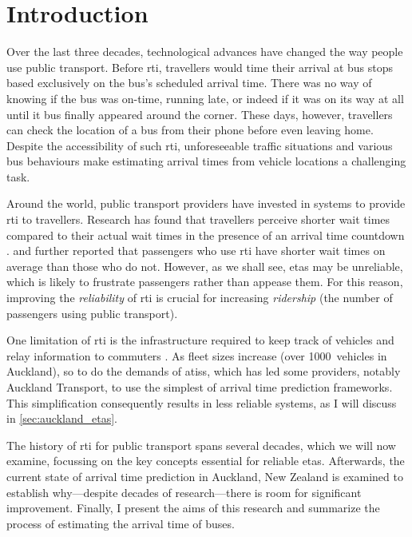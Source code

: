 \glsresetall

\chapter{Introduction}
\label{cha:intro}


Over the last three decades, technological advances have changed the way people use public transport. Before \gls{rti}, travellers would time their arrival at bus stops based exclusively on the bus's scheduled arrival time. There was no way of knowing if the bus was on-time, running late, or indeed if it was on its way at all until it bus finally appeared around the corner. These days, however, travellers can check the location of a bus from their phone before even leaving home. Despite the accessibility of such \gls{rti}, unforeseeable traffic situations and various bus behaviours make estimating arrival times from vehicle locations a challenging task.


Around the world, public transport providers have invested in systems to provide \gls{rti} to travellers. Research has found that travellers perceive shorter wait times compared to their actual wait times in the presence of an arrival time countdown \citep{TCRP_2003}. \citet{Cats_2015} and \citet{Lu_2017} further reported that passengers who use \gls{rti} have shorter wait times on average than those who do not. However, as we shall see, \glspl{eta} may be unreliable, which is likely to frustrate passengers rather than appease them. For this reason, improving the \emph{reliability} of \gls{rti} is crucial for increasing \emph{ridership} (the number of passengers using public transport).


One limitation of \gls{rti} is the infrastructure required to keep track of vehicles and relay information to commuters \citep{TCRP_2003b}. As fleet sizes increase (over 1000~vehicles in Auckland), so to do the demands of \glspl{atis}, which has led some providers, notably Auckland Transport, to use the simplest of arrival time prediction frameworks. This simplification consequently results in less reliable systems, as I will discuss in \cref{sec:auckland_etas}.


The history of \gls{rti} for public transport spans several decades, which we will now examine, focussing on the key concepts essential for reliable \glspl{eta}. Afterwards, the current state of arrival time prediction in Auckland, New Zealand is examined to establish why---despite decades of research---there is room for significant improvement. Finally, I present the aims of this research and summarize the process of estimating the arrival time of buses.




